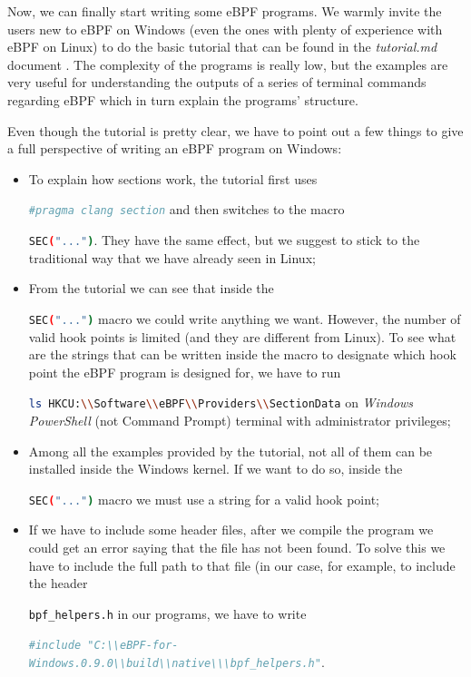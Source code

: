 Now, we can finally start writing some eBPF programs.
We warmly invite the users new to eBPF on Windows (even the ones with plenty of experience with eBPF on Linux) to do the basic tutorial that can be found in the \textit{tutorial.md} document \cite{TutDoc}.
The complexity of the programs is really low, but the examples are very useful for understanding the outputs of a series of terminal commands regarding eBPF which in turn explain the programs' structure.

Even though the tutorial is pretty clear, we have to point out a few things to give a full perspective of writing an eBPF program on Windows:

\begin{itemize}
	\item 
		To explain how sections work, the tutorial first uses \raggedright\colorbox{backcolour}{\lstinline[style=commandline, language=bash]|#pragma clang section|} and then switches to the macro \raggedright\raggedright\colorbox{backcolour}{\lstinline[style=commandline, language=bash]|SEC("...")|}.
		They have the same effect, but we suggest to stick to the traditional way that we have already seen in Linux; 
	\item 
		From the tutorial we can see that inside the \raggedright\raggedright\colorbox{backcolour}{\lstinline[style=commandline, language=bash]|SEC("...")|} macro we could write anything we want.
		However, the number of valid hook points is limited (and they are different from Linux).
		To see what are the strings that can be written inside the macro to designate which hook point the eBPF program is designed for, we have to run \raggedright\raggedright\colorbox{backcolour}{\lstinline[style=commandline, language=bash]|ls HKCU:\\Software\\eBPF\\Providers\\SectionData|} on \textit{Windows PowerShell} (not Command Prompt) terminal with administrator privileges;
	\item 
		Among all the examples provided by the tutorial, not all of them can be installed inside the Windows kernel.
		If we want to do so, inside the \raggedright\colorbox{backcolour}{\lstinline[style=commandline, language=bash]|SEC("...")|} macro we must use a string for a valid hook point;
	\item 
		If we have to include some header files, after we compile the program we could get an error saying that the file has not been found.
		To solve this we have to include the full path to that file (in our case, for example, to include the header \raggedright\colorbox{backcolour}{\lstinline[style=commandline, language=bash]|bpf_helpers.h|} in our programs, we have to write \raggedright\raggedright\colorbox{backcolour}{\lstinline[style=commandline, language=bash]|#include "C:\\eBPF-for-Windows.0.9.0\\build\\native\\\bpf_helpers.h"|}.
\end{itemize}

